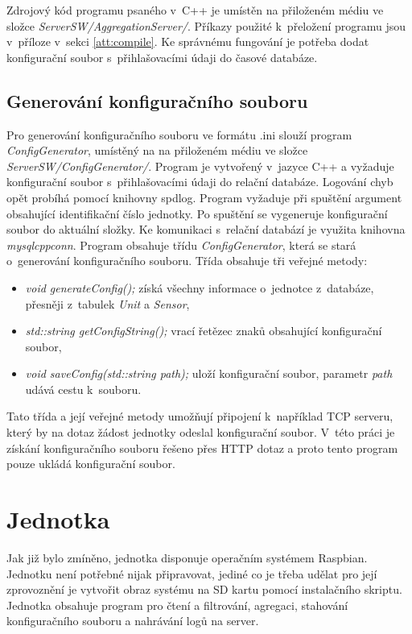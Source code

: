 Zdrojový kód programu psaného v~C++ je umístěn na přiloženém médiu ve složce \textit{ServerSW/AggregationServer/}. Příkazy použité k~přeložení programu jsou v~příloze v~sekci \ref{att:compile}. Ke správnému fungování je potřeba dodat konfigurační soubor s~přihlašovacími údaji do časové databáze.

\subsection{Generování konfiguračního souboru}
Pro generování konfiguračního souboru ve formátu .ini slouží program \textit{ConfigGenerator}, umístěný na na přiloženém médiu ve složce \textit{ServerSW/ConfigGenerator/}. Program je vytvořený v~jazyce C++ a vyžaduje konfigurační soubor s~přihlašovacími údaji do relační databáze. Logování chyb opět probíhá pomocí knihovny spdlog. Program vyžaduje při spuštění argument obsahující identifikační číslo jednotky. Po spuštění se vygeneruje konfigurační soubor do aktuální složky. Ke komunikaci s~relační databází je využita knihovna \textit{mysqlcppconn}. Program obsahuje třídu \textit{ConfigGenerator}, která se stará o~generování konfiguračního souboru. Třída obsahuje tři veřejné metody:
\begin{itemize}
    \item \textit{void generateConfig();} získá všechny informace o~jednotce z~databáze, přesněji z~tabulek \textit{Unit} a \textit{Sensor},
    \item \textit{std::string getConfigString();} vrací řetězec znaků obsahující konfigurační soubor,
    \item \textit{void saveConfig(std::string path);} uloží konfigurační soubor, parametr \textit{path} udává cestu k~souboru.
\end{itemize}
Tato třída a její veřejné metody umožňují připojení k~například TCP serveru, který by na dotaz žádost jednotky odeslal konfigurační soubor. V~této práci je získání konfiguračního souboru řešeno přes HTTP dotaz a proto tento program pouze ukládá konfigurační soubor.




\section{Jednotka}
Jak již bylo zmíněno, jednotka disponuje operačním systémem Raspbian. Jednotku není potřebné nijak připravovat, jediné co je třeba udělat pro její zprovoznění je vytvořit obraz systému na SD kartu pomocí instalačního skriptu. Jednotka obsahuje program pro čtení a filtrování, agregaci, stahování konfiguračního souboru a nahrávání logů na server.

